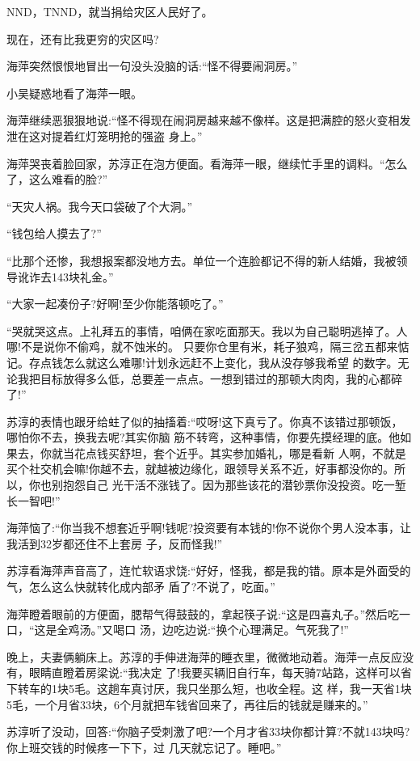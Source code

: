 \documentclass[11pt,a4paper,onecolumn]{article}
\begin{document}
NND，TNND，就当捐给灾区人民好了。

现在，还有比我更穷的灾区吗?

海萍突然恨恨地冒出一句没头没脑的话:``怪不得要闹洞房。''

小吴疑惑地看了海萍一眼。

海萍继续恶狠狠地说:``怪不得现在闹洞房越来越不像样。这是把满腔的怒火变相发泄在这对提着红灯笼明抢的强盗
身上。''

海萍哭丧着脸回家，苏淳正在泡方便面。看海萍一眼，继续忙手里的调料。``怎么了，这么难看的脸?''

``天灾人祸。我今天口袋破了个大洞。''

``钱包给人摸去了?''

``比那个还惨，我想报案都没地方去。单位一个连脸都记不得的新人结婚，我被领导讹诈去143块礼金。''

``大家一起凑份子?好啊!至少你能落顿吃了。''

``哭就哭这点。上礼拜五的事情，咱俩在家吃面那天。我以为自己聪明逃掉了。人哪!不是说你不偷鸡，就不蚀米的。
只要你仓里有米，耗子狼鸡，隔三岔五都来惦记。存点钱怎么就这么难哪!计划永远赶不上变化，我从没存够我希望
的数字。无论我把目标放得多么低，总要差一点点。一想到错过的那顿大肉肉，我的心都碎了!''

苏淳的表情也跟牙给蛀了似的抽搐着:``哎呀!这下真亏了。你真不该错过那顿饭，哪怕你不去，换我去呢?其实你脑
筋不转弯，这种事情，你要先摸经理的底。他如果去，你就当花点钱买舒坦，套个近乎。其实参加婚礼，哪是看新
人啊，不就是买个社交机会嘛!你越不去，就越被边缘化，跟领导关系不近，好事都没你的。所以，你也别抱怨自己
光干活不涨钱了。因为那些该花的潜钞票你没投资。吃一堑长一智吧!''

海萍恼了:``你当我不想套近乎啊!钱呢?投资要有本钱的!你不说你个男人没本事，让我活到32岁都还住不上套房
子，反而怪我!''

苏淳看海萍声音高了，连忙软语求饶:``好好，怪我，都是我的错。原本是外面受的气，怎么这么快就转化成内部矛
盾了?不说了，吃面。''

海萍瞪着眼前的方便面，腮帮气得鼓鼓的，拿起筷子说:``这是四喜丸子。''然后吃一口，``这是全鸡汤。''又喝口
汤，边吃边说:``换个心理满足。气死我了!''

晚上，夫妻俩躺床上。苏淳的手伸进海萍的睡衣里，微微地动着。海萍一点反应没有，眼睛直瞪着房梁说:``我决定
了!我要买辆旧自行车，每天骑7站路，这样可以省下转车的1块5毛。这趟车真讨厌，我只坐那么短，也收全程。这
样，我一天省1块5毛，一个月省33块，6个月就把车钱省回来了，再往后的钱就是赚来的。''

苏淳听了没动，回答:``你脑子受刺激了吧?一个月才省33块你都计算?不就143块吗?你上班交钱的时候疼一下下，过
几天就忘记了。睡吧。''
\end{document}
